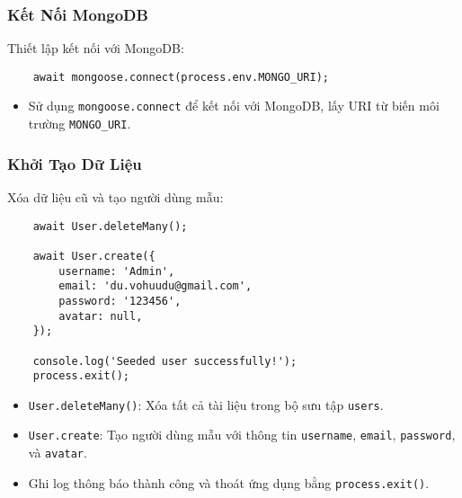             \subsubsection{Kết Nối MongoDB}
                \hspace*{0.6cm}Thiết lập kết nối với MongoDB:
                \begin{lstlisting}
    await mongoose.connect(process.env.MONGO_URI);
                \end{lstlisting}
                \begin{itemize}
                    \item Sử dụng \texttt{mongoose.connect} để kết nối với MongoDB, lấy URI từ biến môi trường \texttt{MONGO\_URI}.
                \end{itemize}

            \subsubsection{Khởi Tạo Dữ Liệu}
                \hspace*{0.6cm}Xóa dữ liệu cũ và tạo người dùng mẫu:
                \begin{lstlisting}
    await User.deleteMany();

    await User.create({
        username: 'Admin',
        email: 'du.vohuudu@gmail.com',
        password: '123456',
        avatar: null,
    });

    console.log('Seeded user successfully!');
    process.exit();
                \end{lstlisting}
                \begin{itemize}
                    \item \texttt{User.deleteMany()}: Xóa tất cả tài liệu trong bộ sưu tập \texttt{users}.
                    \item \texttt{User.create}: Tạo người dùng mẫu với thông tin \texttt{username}, \texttt{email}, \texttt{password}, và \texttt{avatar}.
                    \item Ghi log thông báo thành công và thoát ứng dụng bằng \texttt{process.exit()}.
                \end{itemize}

